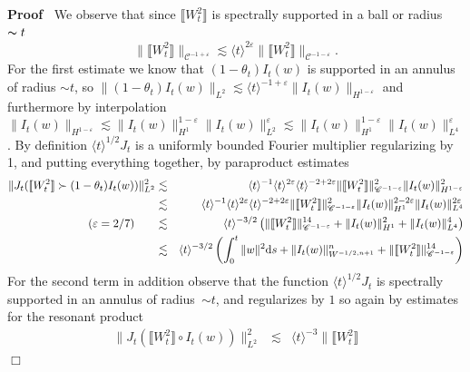\documentclass[11pt]{article}
\newcommand{\mathd}{\mathrm{d}}
\newenvironment{proof}{\noindent\textbf{Proof\ }}{\hspace*{\fill}$\Box$\medskip}
\newcommand{\VV}{\mathscr{C}}
\begin{document}
\begin{proof}
  We observe that since $\llbracket W_t^2 \rrbracket$ is spectrally supported
  in a ball or radius $\thicksim t$
  \[ \| \llbracket W_t^2 \rrbracket \|_{\VV^{- 1 + \varepsilon}} \lesssim
     \langle t \rangle^{2 \varepsilon} \| \llbracket W_t^2 \rrbracket
     \|_{\VV^{- 1 - \varepsilon}} . \]
  For the first estimate we know that $(1 - \theta_t) I_t (w)$ is supported in
  an annulus of radius $\sim t$, so $\| (1 - \theta_t) I_t (w) \|_{L^2}
  \lesssim \langle t \rangle^{- 1 + \varepsilon} \| I_t (w) \|_{H^{1 -
  \varepsilon}}$ and furthermore by interpolation $\| I_t (w) \|_{H^{1 -
  \varepsilon}} \lesssim \| I_t (w) \|^{1 - \varepsilon}_{H^1} \| I_t (w)
  \|^{\varepsilon}_{L^2} \lesssim \| I_t (w) \|^{1 - \varepsilon}_{H^1} \| I_t
  (w) \|^{\varepsilon}_{L^4}$. By definition $\langle t \rangle^{1 / 2} J_t$
  is a uniformly bounded Fourier multiplier regularizing by 1, and putting
  everything together, by paraproduct estimates
  \begin{eqnarray*}
    \| J_t (\llbracket W_t^2 \rrbracket \succ (1 - \theta_t) I_t (w))
    \|^2_{L^2} & \lesssim & \langle t \rangle^{- 1} \langle t \rangle^{2
    \varepsilon} \langle t \rangle^{- 2 + 2 \varepsilon} \| \llbracket W_t^2
    \rrbracket \|^2_{\VV^{- 1 - \varepsilon}} \| I_t (w) \|^2_{H^{1 -
    \varepsilon}}\\
    & \lesssim & \langle t \rangle^{- 1} \langle t \rangle^{2 \varepsilon}
    \langle t \rangle^{- 2 + 2 \varepsilon} \| \llbracket W_t^2 \rrbracket
    \|^2_{\VV^{- 1 - \varepsilon}} \| I_t (w) \|^{2 - 2 \varepsilon}_{H^1} \|
    I_t (w) \|^{2 \varepsilon}_{L^4}\\
    \small{(\varepsilon = 2 / 7)} \qquad & \lesssim & \langle t \rangle^{- 3 /
    2} \left( \| \llbracket W_t^2 \rrbracket \|^{14}_{\VV^{- 1 - \varepsilon}}
    + \| I_t (w) \|^2_{H^1} + \| I_t (w) \|^4_{L^4} \right)\\
    & \lesssim & \langle t \rangle^{- 3 / 2} \left( \int^t_0 \| w \|^2 \mathd
    s + \| I_t (w) \|^n_{W^{- 1 / 2, n + 1}} + \| \llbracket W_t^2 \rrbracket
    \|^{14}_{\VV^{- 1 - \varepsilon}} \right)
  \end{eqnarray*}
  For the second term in addition observe that the function $\langle t
  \rangle^{1 / 2} J_t$ is spectrally supported in an annulus of radius~$\sim
  t$, and regularizes by $1$ so again by estimates for the resonant product
  \[ \begin{array}{lll}
       \| J_t (\llbracket W_t^2 \rrbracket \circ I_t (w)) \|^2_{L^2} &
       \lesssim & \langle t \rangle^{- 3} \| \llbracket W_t^2 \rrbracket

\end{array}\]
\end{proof}
\end{document}
